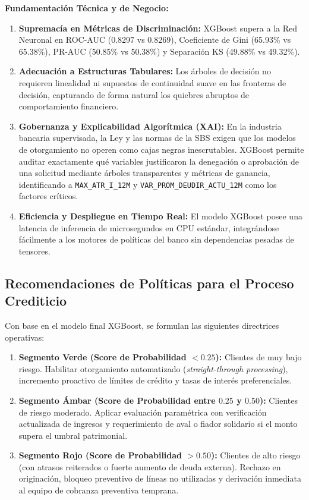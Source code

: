 \documentclass[11pt,a4paper]{article}
\begin{document}
\textbf{Fundamentación Técnica y de Negocio:}
\begin{enumerate}
    \item \textbf{Supremacía en Métricas de Discriminación:} XGBoost supera a la Red Neuronal en ROC-AUC (0.8297 vs 0.8269), Coeficiente de Gini (65.93\% vs 65.38\%), PR-AUC (50.85\% vs 50.38\%) y Separación KS (49.88\% vs 49.32\%).
    \item \textbf{Adecuación a Estructuras Tabulares:} Los árboles de decisión no requieren linealidad ni supuestos de continuidad suave en las fronteras de decisión, capturando de forma natural los quiebres abruptos de comportamiento financiero.
    \item \textbf{Gobernanza y Explicabilidad Algorítmica (XAI):} En la industria bancaria supervisada, la Ley y las normas de la SBS exigen que los modelos de otorgamiento no operen como cajas negras inescrutables. XGBoost permite auditar exactamente qué variables justificaron la denegación o aprobación de una solicitud mediante árboles transparentes y métricas de ganancia, identificando a \texttt{MAX\_ATR\_I\_12M} y \texttt{VAR\_PROM\_DEUDIR\_ACTU\_12M} como los factores críticos.
    \item \textbf{Eficiencia y Despliegue en Tiempo Real:} El modelo XGBoost posee una latencia de inferencia de microsegundos en CPU estándar, integrándose fácilmente a los motores de políticas del banco sin dependencias pesadas de tensores.
\end{enumerate}

\subsection{Recomendaciones de Políticas para el Proceso Crediticio}
Con base en el modelo final XGBoost, se formulan las siguientes directrices operativas:
\begin{enumerate}[leftmargin=1.5cm]
    \item \textbf{Segmento Verde (Score de Probabilidad $< 0.25$):} Clientes de muy bajo riesgo. Habilitar otorgamiento automatizado (\textit{straight-through processing}), incremento proactivo de límites de crédito y tasas de interés preferenciales.
    \item \textbf{Segmento Ámbar (Score de Probabilidad entre $0.25$ y $0.50$):} Clientes de riesgo moderado. Aplicar evaluación paramétrica con verificación actualizada de ingresos y requerimiento de aval o fiador solidario si el monto supera el umbral patrimonial.
    \item \textbf{Segmento Rojo (Score de Probabilidad $> 0.50$):} Clientes de alto riesgo (con atrasos reiterados o fuerte aumento de deuda externa). Rechazo en originación, bloqueo preventivo de líneas no utilizadas y derivación inmediata al equipo de cobranza preventiva temprana.
\end{enumerate}
\end{document}
